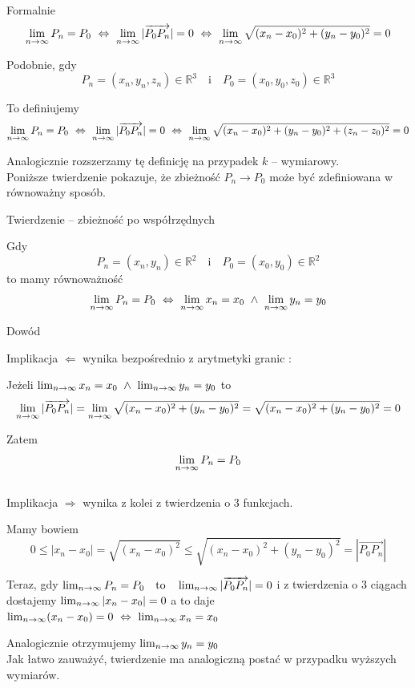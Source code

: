 Formalnie
$$ \limn P_n = P_0 \ \Leftrightarrow \ \limn |\overrightarrow{P_0 P_n}| = 0
\ \Leftrightarrow \ \limn \sqrt{(x_n - x_0)^2 + (y_n - y_0)^2} = 0 $$

Podobnie, gdy
$$ P_n = (x_n, y_n, z_n) \in \mathbb{R}^3 \quad \textrm{i} \quad P_0 = (x_0, y_0, z_0) \in \mathbb{R}^3 $$

To definiujemy
$$ \limn P_n = P_0 \ \Leftrightarrow \ \limn |\overrightarrow{P_0 P_n}| = 0
\ \Leftrightarrow \ \limn \sqrt{(x_n - x_0)^2 + (y_n - y_0)^2 + (z_n - z_0)^2} = 0 $$

Analogicznie rozszerzamy tę definicję na przypadek $k$ -- wymiarowy. \\

Poniższe twierdzenie pokazuje, że zbieżność $ P_n \to P_0 $ może być zdefiniowana w równoważny sposób. \\

\begin{tw}{Twierdzenie -- zbieżność po współrzędnych }

Gdy
\[ P_n = (x_n, y_n) \in \mathbb{R}^2 \quad \textrm{i} \quad P_0 = (x_0, y_0) \in \mathbb{R}^2 \]
to mamy równoważność
\[ \limn P_n = P_0 \ \Leftrightarrow \ \limn x_n = x_0 \ \land \ \limn y_n = y_0 \]
\end{tw}

Dowód 

Implikacja $ \Leftarrow $ wynika bezpośrednio z arytmetyki granic :

Jeżeli $ \lim_{n \to \infty} x_n = x_0 \ \land \ \lim_{n \to \infty} y_n = y_0 $ to
$$ \lim_{n \to \infty} |\overrightarrow{P_0 P_n}| = \lim_{n \to \infty} \sqrt{(x_n - x_0)^2 + (y_n - y_0)^2} = \sqrt{(x_n - x_0)^2 + (y_n - y_0)^2} = 0 $$

Zatem
$$ \lim_{n \to \infty} P_n = P_0 $$ \\

Implikacja $ \Rightarrow $ wynika z kolei z twierdzenia o 3 funkcjach. 

Mamy bowiem
$$ 0 \leq |x_n - x_0| = \sqrt{(x_n - x_0)^2} \leq \sqrt{(x_n - x_0)^2 + (y_n - y_0)^2} = |\overrightarrow{P_0 P_n}| $$

Teraz, gdy $ \lim_{n \to \infty} P_n = P_0 \quad \textrm{to} \quad \lim_{n \to \infty} |\overrightarrow{P_0 P_n}| = 0 $
i z twierdzenia o 3 ciągach dostajemy $ \lim_{n \to \infty} |x_n - x_0| = 0 $ a to daje
$ \lim_{n \to \infty} (x_n - x_0) = 0 \ \Leftrightarrow \ \lim_{n \to \infty} x_n = x_0 $

Analogicznie otrzymujemy $ \lim_{n \to \infty} y_n = y_0 $ \\

Jak łatwo zauważyć, twierdzenie ma analogiczną postać w przypadku wyższych wymiarów. \\


